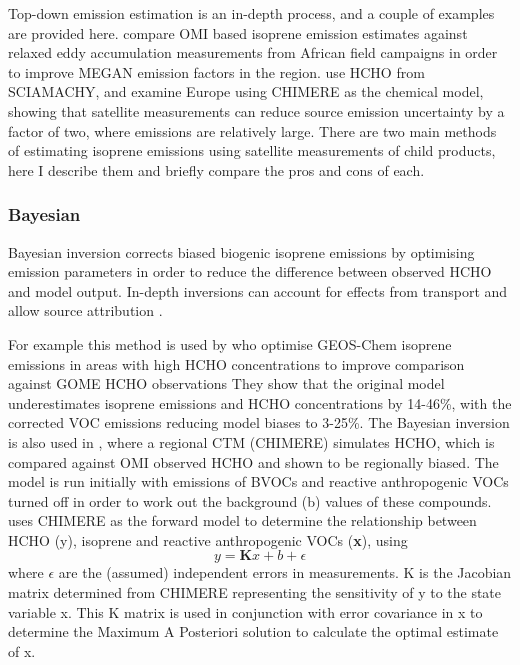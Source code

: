     Top-down emission estimation is an in-depth process, and a couple of examples are provided here.
    \textcite{Marais2014} compare OMI based isoprene emission estimates against relaxed eddy accumulation measurements from African field campaigns in order to improve MEGAN emission factors in the region.
    \textcite{Dufour2009} use HCHO from SCIAMACHY, and examine Europe using CHIMERE as the chemical model, showing that satellite measurements can reduce source emission uncertainty by a factor of two, where emissions are relatively large.
    There are two main methods of estimating isoprene emissions using satellite measurements of child products, here I describe them and briefly compare the pros and cons of each.
    
    \subsubsection{Bayesian}
    
      Bayesian inversion corrects biased biogenic isoprene emissions by optimising emission parameters in order to reduce the difference between observed HCHO and model output.
      In-depth inversions can account for effects from transport and allow source attribution \parencite{FortemsCheiney2012}.
      
      
      For example this method is used by \textcite{Shim2005} who optimise GEOS-Chem isoprene emissions in areas with high HCHO concentrations to improve comparison against GOME HCHO observations %
      They show that the original model underestimates isoprene emissions and HCHO concentrations by 14-46\%, with the corrected VOC emissions reducing model biases to 3-25\%.
      The Bayesian inversion is also used in \textcite{Curci2010}, where a regional CTM (CHIMERE) simulates HCHO, which is compared against OMI observed HCHO and shown to be regionally biased.
      The model is run initially with emissions of BVOCs and reactive anthropogenic VOCs turned off in order to work out the background (b) values of these compounds.
      \textcite{Curci2010} uses CHIMERE as the forward model to determine the relationship between HCHO (y), isoprene and reactive anthropogenic VOCs (\textbf{x}), using 
      \begin{equation}
      y=\mathbf{K}x + b + \epsilon
      \end{equation}
      where $\epsilon$ are the (assumed) independent errors in measurements.
      K is the Jacobian matrix determined from CHIMERE representing the sensitivity of y to the state variable x.
      This K matrix is used in conjunction with error covariance in x to determine the Maximum A Posteriori solution to calculate the optimal estimate of x. %
      
